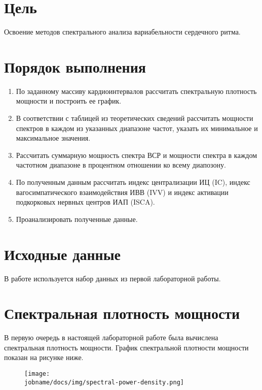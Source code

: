 \section*{Цель}

Освоение методов спектрального анализа вариабельности сердечного ритма.

\section*{Порядок выполнения}

\begin{enumerate}
    \item По заданному массиву кардиоинтервалов рассчитать спектральную плотность мощности и построить ее график.
    \item В соответствии с таблицей из теоретических сведений рассчитать мощности спектров в каждом из указанных диапазоне частот, указать их минимальное и максимальное значения.
    \item Рассчитать суммарную мощность спектра ВСР и мощности спектра в каждом частотном диапазоне в процентном отношении ко всему диапозону.
    \item По полученным данным рассчитать индекс централизации ИЦ (IC), индекс вагосимпатического взаимодействия ИВВ (IVV) и индекс активации подкорковых нервных центров ИАП (ISCA).
    \item Проанализировать полученные данные.
\end{enumerate}

\section*{Исходные данные}

В работе используется набор данных из первой лабораторной работы.

\newpage

\section*{Спектральная плотность мощности}

В первую очередь в настоящей лабораторной работе была вычислена спектральная плотность мощности.
График спектральной плотности мощности показан на рисунке ниже.

\begin{figure}[h!]
    \centering
    \texttt{[image: \\jobname/docs/img/spectral-power-density.png]}
\end{figure}

